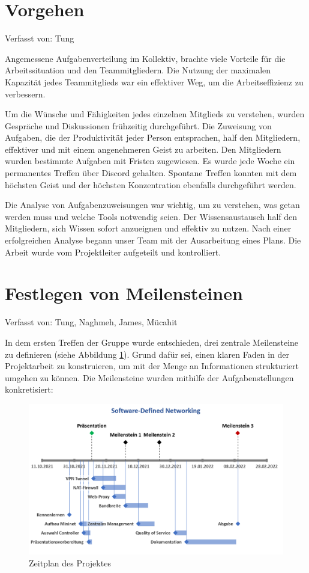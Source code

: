 \documentclass[fontsize=12pt,paper=a4,open=any,parskip=half,
  twoside=false,toc=listof,toc=bibliography,fleqn,leqno,
  captions=nooneline,captions=tableabove,british]{scrbook}
\begin{document}
\section{Vorgehen}
{\tiny Verfasst von: Tung\par}
Angemessene Aufgabenverteilung im Kollektiv, brachte viele Vorteile für die Arbeitssituation und den Teammitgliedern. Die Nutzung der maximalen Kapazität jedes Teammitglieds war ein effektiver Weg, um die Arbeitseffizienz zu verbessern.\par
Um die Wünsche und Fähigkeiten jedes einzelnen Mitglieds zu verstehen, wurden Gespräche und Diskussionen frühzeitig durchgeführt. Die Zuweisung von Aufgaben, die der Produktivität jeder Person entsprachen, half den Mitgliedern, effektiver und mit einem angenehmeren Geist zu arbeiten. Den Mitgliedern wurden bestimmte Aufgaben mit Fristen zugewiesen. Es wurde jede Woche ein permanentes Treffen über Discord gehalten. Spontane Treffen konnten mit dem höchsten Geist und der höchsten Konzentration ebenfalls durchgeführt werden.\par
Die Analyse von Aufgabenzuweisungen war wichtig, um zu verstehen, was getan werden muss und welche Tools notwendig seien. Der Wissensaustausch half den Mitgliedern, sich Wissen sofort anzueignen und effektiv zu nutzen. Nach einer erfolgreichen Analyse begann unser Team mit der Ausarbeitung eines Plans. Die Arbeit wurde vom Projektleiter aufgeteilt und kontrolliert.

\section{Festlegen von Meilensteinen}
{\tiny Verfasst von: Tung, Naghmeh, James, Mücahit\par}
In dem ersten Treffen der Gruppe wurde entschieden, drei zentrale Meilensteine zu definieren (siehe Abbildung \ref{milestones}). Grund dafür sei, einen klaren Faden in der Projektarbeit zu konstruieren, um mit der Menge an Informationen strukturiert umgehen zu können. Die Meilensteine wurden mithilfe der Aufgabenstellungen konkretisiert:

\begin{figure}[H]
 \centering
 \includegraphics[width=1.0\textwidth]{Bilder/meilensteine}
 \captionsetup{justification=centering,margin=2cm}
 \caption{Zeitplan des Projektes}
 \label{milestones}
\end{figure}
\end{document}
